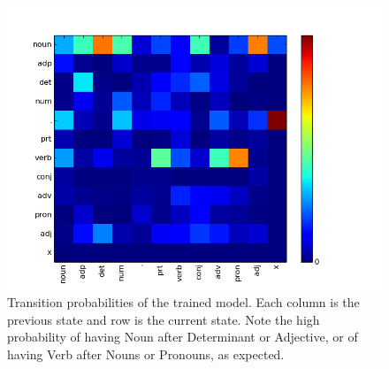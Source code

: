\begin{figure}[h!]
\centering
\includegraphics[scale=.5]{figs/sequences/transition_probs}
\caption{\label{fig:transProbs} Transition probabilities of the
trained model. Each column is the previous state and row is the current
state. Note the high probability of having Noun after Determinant or Adjective, or of having Verb after Nouns or Pronouns, as expected.}
\end{figure}

